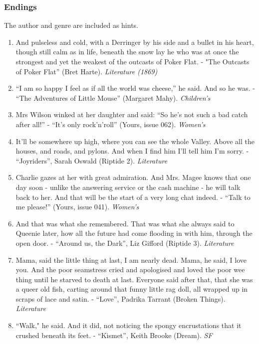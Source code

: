 \documentclass[11pt]{article}
\begin{document}
\subsubsection*{Endings}
The author and genre are included as hints.
\begin{enumerate}
\item And pulseless and cold, with a Derringer by his side and a bullet in his heart, though still calm as in life, beneath the snow lay he who was at once the strongest and yet the weakest of the outcasts of Poker Flat. - "The Outcasts of Poker Flat''  (Bret Harte). \textit{Literature (1869)}
\item ``I am so happy I feel as if all the world was cheese,'' he said. And
so he was. - ``The Adventures of Little Mouse'' (Margaret Mahy). \textit{Children's}

\item Mrs Wilson winked at her daughter and said: ``So he's not such a bad catch after all!'' - ``It's only rock'n'roll'' (Yours, issue 062).  \textit{Women's}

\item It'll be somewhere up high, where you can see the whole Valley. Above all
the houses, and roads, and pylons. And when I find him I'll tell him I'm
sorry. - ``Joyriders'', Sarah Oswald  (Riptide 2). \textit{Literature}

\item Charlie gazes at her with great admiration. And Mrs. Magee knows that 
one day soon - unlike the answering service or the cash machine - he will talk back to her. And that will be the start of a very long chat indeed. - ``Talk to me please!'' (Yours, issue 041). \textit{Women's} 

\item And that was what she remembered. That was what she always said to Queenie
later, how all the future had come flooding in with him, through the open
door. - ``Around us, the Dark'', Liz Gifford (Riptide 3). \textit{Literature}

\item Mama, said the little thing at last, I am nearly dead. Mama, he said, I
love you. And the poor seamstress cried and apologised and loved the poor
wee thing until he starved to death at last. Everyone said after that, that
she was a queer old fish, carting around that funny little rag doll, all
wrapped up in scraps of lace and satin. - ``Love'', Padrika Tarrant (Broken Things). \textit{Literature}

\item ``Walk," he said. And it did, not noticing the spongy encrustations that it
crushed beneath its feet. - ``Kismet'', Keith Brooke (Dream). \textit{SF}


\end{enumerate}
\end{document}
